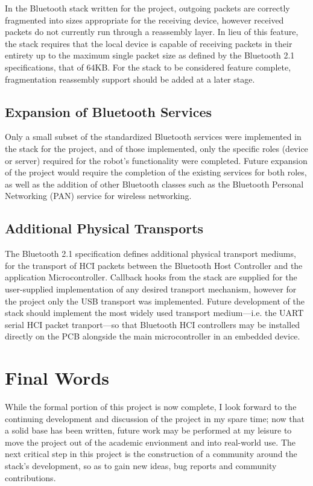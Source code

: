 In the Bluetooth stack written for the project, outgoing packets are correctly fragmented into sizes appropriate for the receiving device, however received packets do not currently run through a reassembly layer. In lieu of this feature, the stack requires that the local device is capable of receiving packets in their entirety up to the maximum single packet size as defined by the Bluetooth 2.1 specifications, that of 64KB. For the stack to be considered feature complete, fragmentation reassembly support should be added at a later stage.

\subsection{Expansion of Bluetooth Services}

Only a small subset of the standardized Bluetooth services were implemented in the stack for the project, and of those implemented, only the specific roles (device or server) required for the robot's functionality were completed. Future expansion of the project would require the completion of the existing services for both roles, as well as the addition of other Bluetooth classes such as the Bluetooth Personal Networking (PAN) service for wireless networking.

\subsection{Additional Physical Transports}

The Bluetooth 2.1 specification defines additional physical transport mediums, for the transport of HCI packets between the Bluetooth Host Controller and the application Microcontroller. Callback hooks from the stack are supplied for the user-supplied implementation of any desired transport mechanism, however for the project only the USB transport was implemented. Future development of the stack should implement the most widely used transport medium---i.e. the UART serial HCI packet tranport---so that Bluetooth HCI controllers may be installed directly on the PCB alongside the main microcontroller in an embedded device.

\section{Final Words}

While the formal portion of this project is now complete, I look forward to the continuing development and discussion of the project in my spare time; now that a solid base has been written, future work may be performed at my leisure to move the project out of the academic envionment and into real-world use. The next critical step in this project is the construction of a community around the stack's development, so as to gain new ideas, bug reports and community contributions.

